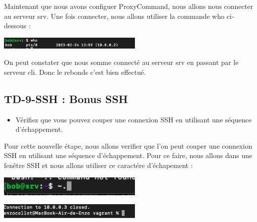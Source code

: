 \documentclass[12pt]{article}
\begin{document}
Maintenant que nous avons configuer ProxyCommand, nous allons nous connecter au serveur srv. Une fois connecter, nous allons utiliser la commande who ci-dessous : 

\vspace{0.3cm}

\begin{center}
  \includegraphics[width=7cm]{Image-TD-SSH-8/commande-who-2.png}
\end{center}

\vspace{0.3cm}

On peut constater que nous somme connecté au serveur srv en passant par le serveur cli. Donc le rebonds c'est bien effectué.

\newpage

\subsection{TD-9-SSH : Bonus SSH}

\vspace{0.3cm}

\begin{itemize}
  \item Vérifiez que vous pouvez couper une connexion SSH en utilisant une séquence d’échappement.
\end{itemize}

\vspace{0.3cm}

Pour cette nouvelle étape, nous allons verifier que l'on peut couper une connexion SSH en utilisant une séquence d’échappement. Pour ce faire, nous allons dans une fenêtre SSH et nous allons utiliser ce caractére d'échapement : 

\vspace{0.3cm}

\begin{center}
  \includegraphics[width=7cm]{Image-TD-SSH-9/echappement.png}
\end{center}

\vspace{0.3cm}

\begin{center}
  \includegraphics[width=7cm]{Image-TD-SSH-9/fin-de-conection.png}
\end{center}
\end{document}
